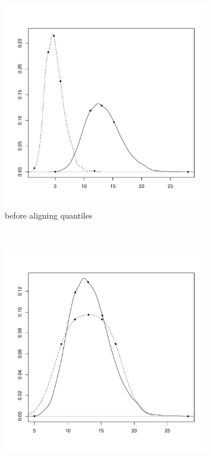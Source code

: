\begin{figure}[ht]
\begin{subfigure}[b]{.5\textwidth}
\centering
\includegraphics[scale=.4]{figures/normalisation-quantile-a.pdf} 
\caption{before aligning quantiles}
\end{subfigure}
~
\begin{subfigure}[b]{.5\textwidth}
\centering
\includegraphics[scale=.4]{figures/normalisation-quantile-b.pdf} 

\end{subfigure}
\end{figure}

